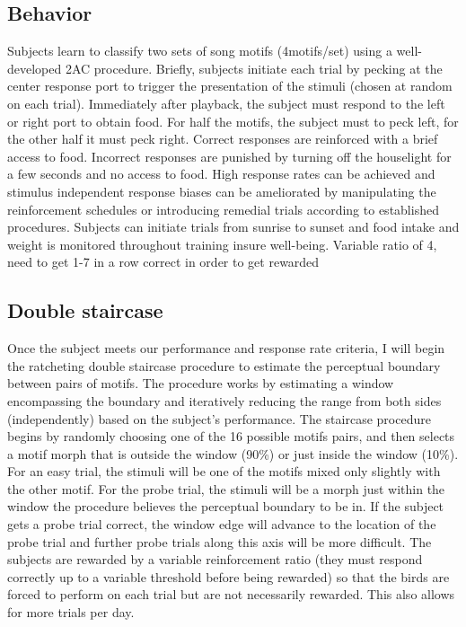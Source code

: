 \subsection*{Behavior}
Subjects learn to classify two sets of song motifs (4motifs/set) using a well-developed \ac{2AC} procedure\cite{gentner2003neuronal}. Briefly, subjects initiate each trial by pecking at the center response port to trigger the presentation of the stimuli (chosen at random on each trial). Immediately after playback, the subject must respond to the left or right port to obtain food. For half the motifs, the subject must to peck left, for the other half it must peck right. Correct responses are reinforced with a brief access to food. Incorrect responses are punished by turning off the houselight for a few seconds and no access to food. High response rates can be achieved and stimulus independent response biases can be ameliorated by manipulating the reinforcement schedules or introducing remedial trials according to established procedures. Subjects can initiate trials from sunrise to sunset and food intake and weight is monitored throughout training insure well-being.
Variable ratio of 4, need to get 1-7 in a row correct in order to get rewarded

\subsection*{Double staircase}
Once the subject meets our performance and response rate criteria, I will begin the ratcheting double staircase procedure to estimate the perceptual boundary between pairs of motifs. The procedure works by estimating a window encompassing the boundary and iteratively reducing the range from both sides (independently) based on the subject's performance. The staircase procedure begins by randomly choosing one of the 16 possible motifs pairs, and then selects a motif morph that is outside the window (90\%) or just inside the window (10\%). For an easy trial, the stimuli will be one of the motifs mixed only slightly with the other motif. For the probe trial, the stimuli will be a morph just within the window the procedure believes the perceptual boundary to be in. If the subject gets a probe trial correct, the window edge will advance to the location of the probe trial and further probe trials along this axis will be more difficult. The subjects are rewarded by a variable reinforcement ratio (they must respond correctly up to a variable threshold before being rewarded) so that the birds are forced to perform on each trial but are not necessarily rewarded. This also allows for more trials per day.

